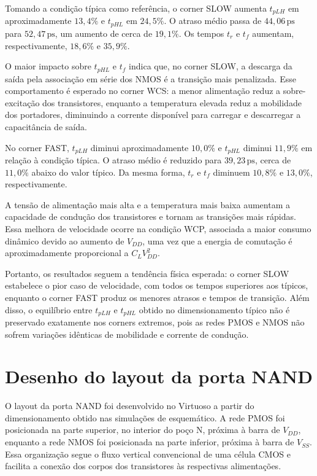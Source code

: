 \documentclass[a4paper]{article}
\begin{document}
Tomando a condição típica como referência, o corner SLOW aumenta $t_{pLH}$ em aproximadamente $13{,}4\%$ e $t_{pHL}$ em $24{,}5\%$. O atraso médio passa de $44{,}06\,\mathrm{ps}$ para $52{,}47\,\mathrm{ps}$, um aumento de cerca de $19{,}1\%$. Os tempos $t_r$ e $t_f$ aumentam, respectivamente, $18{,}6\%$ e $35{,}9\%$.

O maior impacto sobre $t_{pHL}$ e $t_f$ indica que, no corner SLOW, a descarga da saída pela associação em série dos NMOS é a transição mais penalizada. Esse comportamento é esperado no corner WCS: a menor alimentação reduz a sobre-excitação dos transistores, enquanto a temperatura elevada reduz a mobilidade dos portadores, diminuindo a corrente disponível para carregar e descarregar a capacitância de saída.

No corner FAST, $t_{pLH}$ diminui aproximadamente $10{,}0\%$ e $t_{pHL}$ diminui $11{,}9\%$ em relação à condição típica. O atraso médio é reduzido para $39{,}23\,\mathrm{ps}$, cerca de $11{,}0\%$ abaixo do valor típico. Da mesma forma, $t_r$ e $t_f$ diminuem $10{,}8\%$ e $13{,}0\%$, respectivamente.

A tensão de alimentação mais alta e a temperatura mais baixa aumentam a capacidade de condução dos transistores e tornam as transições mais rápidas. Essa melhora de velocidade ocorre na condição WCP, associada a maior consumo dinâmico devido ao aumento de $V_{DD}$, uma vez que a energia de comutação é aproximadamente proporcional a $C_LV_{DD}^{2}$.

Portanto, os resultados seguem a tendência física esperada: o corner SLOW estabelece o pior caso de velocidade, com todos os tempos superiores aos típicos, enquanto o corner FAST produz os menores atrasos e tempos de transição. Além disso, o equilíbrio entre $t_{pLH}$ e $t_{pHL}$ obtido no dimensionamento típico não é preservado exatamente nos corners extremos, pois as redes PMOS e NMOS não sofrem variações idênticas de mobilidade e corrente de condução.

\section{Desenho do layout da porta NAND}

O layout da porta NAND foi desenvolvido no Virtuoso a partir do dimensionamento obtido nas simulações de esquemático. A rede PMOS foi posicionada na parte superior, no interior do poço N, próxima à barra de $V_{DD}$, enquanto a rede NMOS foi posicionada na parte inferior, próxima à barra de $V_{SS}$. Essa organização segue o fluxo vertical convencional de uma célula CMOS e facilita a conexão dos corpos dos transistores às respectivas alimentações.
\end{document}
